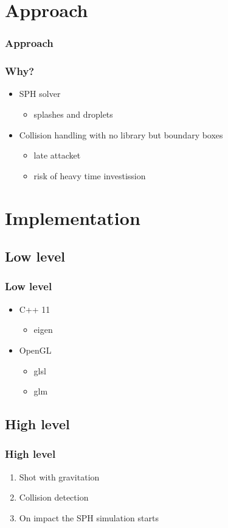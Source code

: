 \section{Approach}
\begin{frame}
	 {\frametitle{Approach}}
	 {\frametitle{Why?}}
	\begin{itemize}[<+->]
		\item<1-> SPH solver
			\begin{itemize}
				\item<2-> splashes and droplets
			\end{itemize}
		\item Collision handling with no library but boundary boxes
			\begin{itemize}
					\item<2-> late attacket
					\item<2-> risk of heavy time investission
			\end{itemize}
	\end{itemize}
\end{frame}
\section{Implementation}
\subsection{Low level}
\begin{frame}
	\frametitle{Low level}
	\begin{itemize}
		\item C++ 11
			\begin{itemize}
				\item eigen
			\end{itemize}
		\item OpenGL
			\begin{itemize}
				\item glsl
				\item glm
			\end{itemize}
	\end{itemize}
\end{frame}
\subsection{High level}
\begin{frame}
	\frametitle{High level}
	\begin{enumerate}
		\item Shot with gravitation
		\item Collision detection
		\item On impact the SPH simulation starts
	\end{enumerate}
\end{frame}
